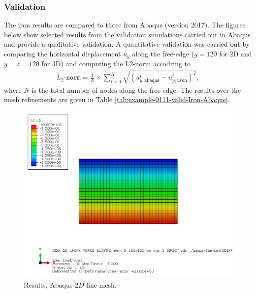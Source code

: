 \subsubsection{Validation}
%


%
The iron results are compared to those from Abaqus (version 2017). The figures below show selected results from the validation simulations carried out in Abaqus and provide a qualitative validation. A quantitative validation was carried out by comparing the horizontal displacement $u_y$ along the free-edge ($y=120$ for 2D and $y=z=120$ for 3D) and computing the L2-norm accodring to
\begin{align}
    L_2\texttt{-norm} = \frac{1}{N} \times  \sum_{i=1}^{N} \sqrt{\left(u_{y,\texttt{abaqus}}^i-u_{y,\texttt{iron}}^i  \right)^2},
\end{align}
where $N$ is the total number of nodes along the free-edge. The results over the mesh refinements are given in Table \ref{tab:example-0111-valid-Iron-Abaqus}.
%
\begin{figure}[h!]
    \centering 
    \includegraphics[width=\columnwidth]{examples/example-0111/doc/figures/2D_UNIAX_FORCE_ELASTIC_elem_5_160x120mm_intp_1_DIRECTU2.png}
    \caption{Results, Abaqus $2D$ fine mesh.}
    \label{example-0111-abaqus-2D-fig}
\end{figure}
%
